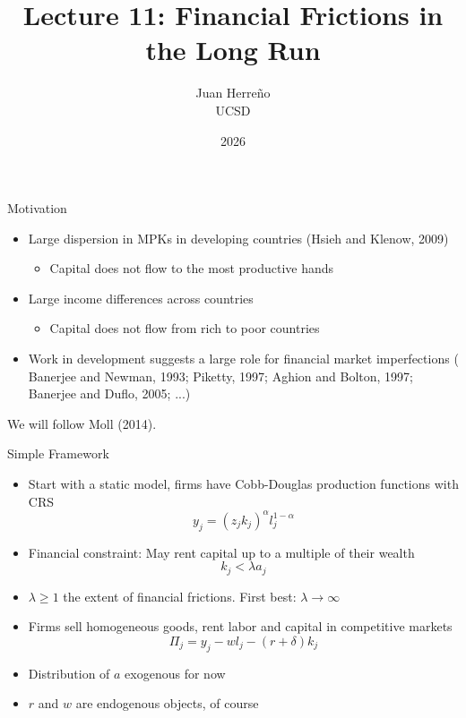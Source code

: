 \documentclass[11pt,aspectratio=169,xcolor={dvipsnames},hyperref={pdftex,pdfpagemode=UseNone,hidelinks,pdfdisplaydoctitle=true},usepdftitle=false]{beamer}
\title{Lecture 11: Financial Frictions in the Long Run}
\author{Juan Herre\~{n}o\\UCSD}
\date{2026}
\begin{document}
\maketitle


\begin{frame}{Motivation}
\begin{itemize}
\item Large dispersion in MPKs in developing countries (Hsieh and Klenow, 2009)
\begin{itemize}
\item Capital does not flow to the most productive hands
\end{itemize}
\item Large income differences across countries 
\begin{itemize}
\item Capital does not flow from rich to poor countries
\end{itemize}
\item Work in development suggests a large role for financial market imperfections ( Banerjee and Newman, 1993; Piketty, 1997; Aghion and Bolton, 1997; Banerjee and Duflo, 2005; ...)
\end{itemize}

We will follow Moll (2014).
\end{frame}


\begin{frame}{Simple Framework}
\begin{itemize}
\item Start with a static model, firms have Cobb-Douglas production functions with CRS
\[y_j = \left(z_j k_j\right)^{\alpha} l_j^{1-\alpha} \]
\item Financial constraint: May rent capital up to a multiple of their wealth
\[k_j < \lambda a_j \]
\item $\lambda \geq 1$ the extent of financial frictions. First best: $\lambda \rightarrow \infty$
\item Firms sell homogeneous goods, rent labor and capital in competitive markets
\[\Pi_j = y_j - w l_j - (r+\delta) k_j \]
\item Distribution of $a$ exogenous for now
\item $r$ and $w$ are endogenous objects, of course
\end{itemize}
\end{frame}
\end{document}
